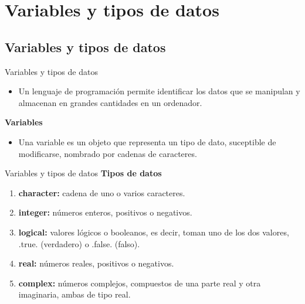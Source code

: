 
\section{Variables y tipos de datos}  


\subsection{Variables y tipos de datos}

\begin{frame}[fragile]{Variables y tipos de datos}
 \begin{itemize}[<+(0)->]
  \item Un lenguaje de programación permite identificar los datos que se manipulan y almacenan en grandes cantidades en un ordenador.
 \end{itemize}
 \vspace{0.2cm}
\textbf{Variables}
 \begin{itemize}[<+(1)->]
  \item Una variable es un objeto que representa un tipo de dato, suceptible de modificarse, nombrado por cadenas de caracteres.
 \end{itemize}
\end{frame}

\begin{frame}[fragile]{Variables y tipos de datos}
\textbf{Tipos de datos}
 \begin{enumerate}[<+(1)->]
  \item \textbf{character:} cadena de uno o varios caracteres.
  \item \textbf{integer:} números enteros, positivos o negativos.
  \item \textbf{logical:} valores lógicos o booleanos, es decir, toman uno de los dos valores, .true. (verdadero) o .false. (falso).
  \item \textbf{real:} números reales, positivos o negativos.
  \item \textbf{complex:} números complejos, compuestos de una parte real y otra imaginaria, ambas de tipo real.
 \end{enumerate}
 \end{frame}

